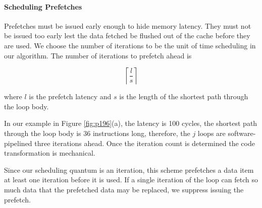 \paragraph{Scheduling Prefetches}

Prefetches must be issued early enough to hide memory latency.
They must not be issued too early lest the data fetched be flushed
out of the cache before they are used. We choose the number of
iterations to be the unit of time scheduling in our algorithm. The
number of iterations to prefetch ahead is

$$
\left\lceil\frac{l}{s}\right\rceil
$$

where $l$ is the prefetch latency and $s$ is the length of the shortest
path through the loop body.

In our example in Figure \ref{fig:p196}(a), the latency is 100 cycles, the
shortest path through the loop body is 36 instructions long, therefore,
the $j$ loops are software-pipelined three iterations ahead. Once the
iteration count is determined the code transformation is mechanical.

Since our scheduling quantum is an iteration, this scheme prefetches a data item at least one iteration before it is used. If a single
iteration of the loop can fetch so much data that the prefetched data
may be replaced, we suppress issuing the prefetch.